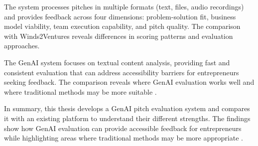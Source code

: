 The system processes pitches in multiple formats (text, files, audio recordings) and provides feedback across four dimensions: problem-solution fit, business model viability, team execution capability, and pitch quality. The comparison with Winds2Ventures reveals differences in scoring patterns and evaluation approaches.

The GenAI system focuses on textual content analysis, providing fast and consistent evaluation that can address accessibility barriers for entrepreneurs seeking feedback. The comparison reveals where GenAI evaluation works well and where traditional methods may be more suitable \cite{TheFutureofAIEv}.


In summary, this thesis develops a GenAI pitch evaluation system and compares it with an existing platform to understand their different strengths. The findings show how GenAI evaluation can provide accessible feedback for entrepreneurs while highlighting areas where traditional methods may be more appropriate \cite{Ozkazanc2022}.

